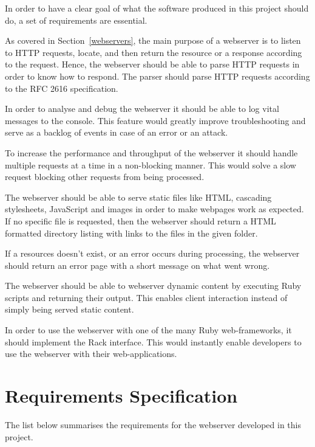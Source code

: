 
In order to have a clear goal of what the software produced in this project
should do, a set of requirements are essential. 

As covered in Section~\ref{webservers}, the main purpose of a webserver is to
listen to HTTP requests, locate, and then return the resource or a response
according to the request. Hence, the webserver should be able to parse HTTP
requests in order to know how to respond. The parser should parse HTTP
requests according to the RFC 2616 specification.

In order to analyse and debug the webserver it should be able to log vital
messages to the console. This feature would greatly improve troubleshooting
and serve as a backlog of events in case of an error or an attack.

To increase the performance and throughput of the webserver it should handle
multiple requests at a time in a non-blocking manner. This would solve a slow
request blocking other requests from being processed.

The webserver should be able to serve static files like HTML, cascading
stylesheets, JavaScript and images in order to make webpages work as expected.
If no specific file is requested, then the webserver should return a HTML
formatted directory listing with links to the files in the given folder.

If a resources doesn't exist, or an error occurs during processing, the
webserver should return an error page with a short message on what went wrong.

The webserver should be able to webserver dynamic content by executing Ruby
scripts and returning their output. This enables client interaction instead of
simply being served static content.

In order to use the webserver with one of the many Ruby web-frameworks, it
should implement the Rack interface. This would instantly enable developers to
use the webserver with their web-applications.

\section{Requirements Specification}
\label{req_spec}
The list below summarises the requirements for the webserver developed in this
project.

